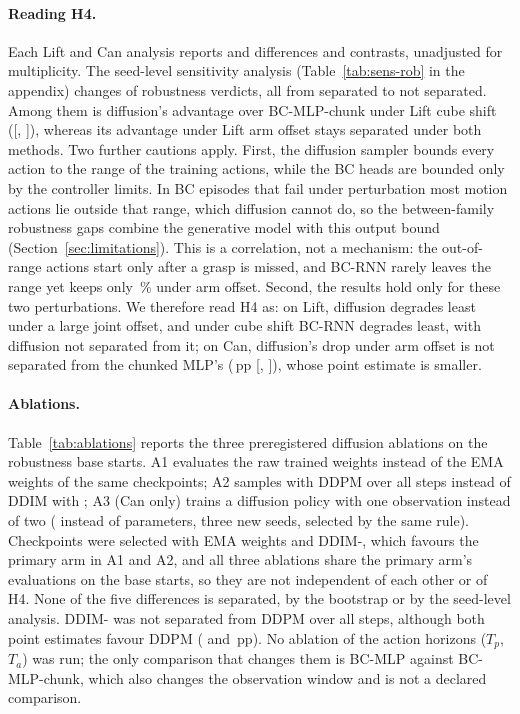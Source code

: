 \paragraph{Reading H4.} Each Lift and Can analysis reports  and
 differences and contrasts, unadjusted for multiplicity. The seed-level
sensitivity analysis (Table~\ref{tab:sens-rob} in the appendix) changes
 of  robustness verdicts, all from separated to not
separated. Among them is diffusion's advantage over BC-MLP-chunk under Lift cube shift
([, ]), whereas its
advantage under Lift arm offset stays separated under both methods. Two further
cautions apply. First, the diffusion sampler bounds every action to the range of the
training actions, while the BC heads are bounded only by the controller limits. In BC
episodes that fail under perturbation most motion actions lie outside that range, which
diffusion cannot do, so the between-family robustness gaps combine the generative model with
this output bound (Section~\ref{sec:limitations}). This is a correlation, not a mechanism:
the out-of-range actions start only after a grasp is missed, and BC-RNN rarely leaves the
range yet keeps only \,\% under arm offset. Second, the results hold
only for these two perturbations. We therefore read H4 as: on Lift, diffusion degrades least
under a large joint offset, and under cube shift BC-RNN degrades least, with diffusion not
separated from it; on Can, diffusion's drop under arm offset is not separated from the
chunked MLP's (\,pp [,
]), whose point estimate is smaller.

\paragraph{Ablations.} Table~\ref{tab:ablations} reports the three preregistered diffusion
ablations on the robustness base starts. A1 evaluates the raw trained weights instead of
the EMA weights of the same checkpoints; A2 samples with DDPM over all  steps
instead of DDIM with ; A3 (Can only) trains a diffusion policy with one
observation instead of two ( instead of 
parameters, three new seeds, selected by the same rule). Checkpoints were selected with EMA
weights and DDIM-, which favours the primary arm in A1 and A2, and all three
ablations share the primary arm's evaluations on the base starts, so they are not
independent of each other or of H4. None of the five differences is separated, by the
bootstrap or by the seed-level analysis. DDIM- was not separated from DDPM over
all  steps, although both point estimates favour DDPM ( and
\,pp). No ablation of the action horizons ($T_p$, $T_a$) was run; the only comparison
that changes them is BC-MLP against BC-MLP-chunk, which also changes the observation window
and is not a declared comparison.

